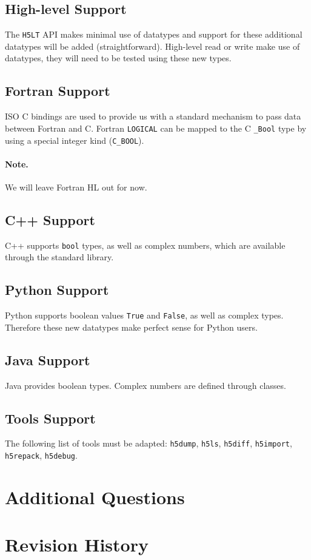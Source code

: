 \documentclass[letterpaper,hyper]{THG_RFC}
\begin{document}
\subsection{High-level Support}
The \texttt{H5LT} API makes minimal use of datatypes and support for these
additional datatypes will be added (straightforward).
High-level read or write make use of datatypes, they will need to be tested
using these new types.

\subsection{Fortran Support}
ISO C bindings are used to provide us with a standard mechanism to pass data
between Fortran and C. Fortran \texttt{LOGICAL} can be mapped to the C
\texttt{\_Bool} type by using a special integer kind (\texttt{C\_BOOL}).

\paragraph{Note.}
We will leave Fortran HL out for now.

\subsection{C++ Support}
C++ supports \texttt{bool} types, as well as complex numbers, which are available
through the standard library. 

\subsection{Python Support}
Python supports boolean values \texttt{True} and \texttt{False}, as well as
complex types. Therefore these new datatypes make perfect sense for Python
users.

\subsection{Java Support}
Java provides boolean types. Complex numbers are defined through classes.

\subsection{Tools Support}
The following list of tools must be adapted: \texttt{h5dump}, \texttt{h5ls},
\texttt{h5diff}, \texttt{h5import}, \texttt{h5repack}, \texttt{h5debug}. 

\section{Additional Questions}

\section*{Revision History}
\makerevisions



\end{document}
